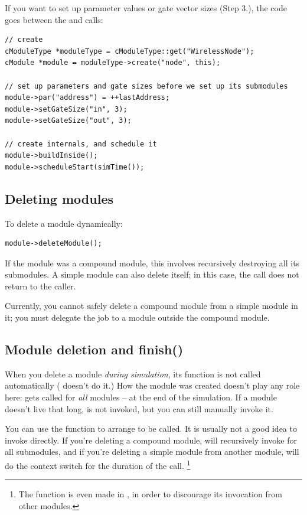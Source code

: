 If you want to set up parameter values or gate vector sizes (Step 3.),
the code goes between the  and
 calls:

\begin{verbatim}
// create
cModuleType *moduleType = cModuleType::get("WirelessNode");
cModule *module = moduleType->create("node", this);

// set up parameters and gate sizes before we set up its submodules
module->par("address") = ++lastAddress;
module->setGateSize("in", 3);
module->setGateSize("out", 3);

// create internals, and schedule it
module->buildInside();
module->scheduleStart(simTime());
\end{verbatim}


\subsection{Deleting modules}


To delete a module dynamically:

\begin{verbatim}
module->deleteModule();
\end{verbatim}

If the module was a compound module, this involves recursively
destroying all its submodules. A simple module can also delete itself;
in this case, the  call does not return to the
caller.

Currently, you cannot safely delete a
compound module from a simple module
in it; you must delegate the job to a module outside the compound
module.


\subsection{Module deletion and finish()}

When you delete a module \textit{during simulation}, its 
function is not called automatically ( doesn't do it.)
How the module was created doesn't play any role here:
 gets called for \textit{all} modules -- at the end of the
simulation. If a module doesn't live that long,  is not
invoked, but you can still manually invoke it.

You can use the  function to arrange 
to be called. It is usually not a good idea to invoke 
directly. If you're deleting a compound module,  will
recursively invoke  for all submodules, and if you're deleting
a simple module from another module,  will do the context
switch for the duration of the call.
  \footnote{The  function is even made 
  in , in order to discourage its invocation from
  other modules.}

